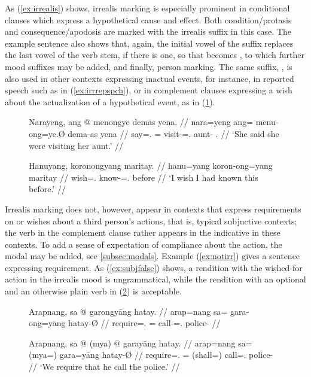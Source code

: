 As (\ref{ex:irrealis}) shows, irrealis marking is especially prominent in
conditional clauses which express a hypothetical cause and effect. Both
condition/protasis and consequence/apodosis are marked with the irrealis suffix
in this case. The example sentence also shows that, again, the initial vowel of
the suffix replaces the last vowel of the verb stem, if there is one, so that
 becomes , to which further mood
suffixes may be added, and finally, person marking. The same suffix,
, is also used in other contexts expressing inactual events,
for instance, in reported speech such as in (\ref{ex:irrrepspch}), or in
complement clauses expressing a wish about the actualization of a hypothetical
event, as in (\ref{ex:irrwish}).

\begin{figure}[h]
\pex
\a\label{ex:irrrepspch}\begingl
	\gla Narayeng, ang @ menongye demās yena. //
	\glb nara=yeng ang= menu-ong=ye.Ø dema-as yena //
	\glc say=\TsgF{}.\Aarg{} \AgtT{}= visit-\Irr{}=\TsgF{}.\Top{} 
		aunt-\Parg{} \TsgF{}.\Gen{} //
	\glft `She said she were visiting her aunt.' //
\endgl

\a\label{ex:irrwish}\begingl
	\gla Hanuyang, koronongyang maritay. //
	\glb hanu=yang koron-ong=yang maritay //
	\glc wish=\Fsg{}.\Aarg{} know-\Irr{}=\Fsg{}.\Aarg{} before //
	\glft `I wish I had known this before.' //
\endgl
\xe
\end{figure}

Irrealis marking does not, however, appear in contexts that express
requirements on or wishes about a third person's actions, that is, typical
subjuctive contexts; the verb in the complement clause rather appears in the
indicative in these contexts. To add a sense of expectation of compliance about
the action, the modal  may be added, see
\autoref{subsec:modals}. Example (\ref{ex:notirr}) gives a sentence expressing
requirement. As (\ref{ex:subjfalse}) shows, a rendition with the wished-for
action in the irrealis mood is ungrammatical, while the rendition with an
optional  and an otherwise plain verb in (\ref{ex:myashall}) is
acceptable.

\begin{figure}[h]
\pex\label{ex:notirr}
\a\label{ex:subjfalse}\ljudge*\begingl
	\gla Arapnang, sa @ garongyāng hatay. //
	\glb arap=nang sa= gara-ong=yāng hatay-Ø //
	\glc require=\Fpl{}.\Aarg{} \PatT{}= call-\Irr{}=\TsgM{}.\Aarg{}
		police-\Top{} //
\endgl

\a\label{ex:myashall}\begingl
	\gla Arapnang, sa @ \textup{(}mya\textup{)} @ garayāng hatay. //
	\glb arap=nang sa= (mya=) gara=yāng hatay-Ø //
	\glc require=\Fpl{}.\Aarg{} \PatT{}= (shall=) call=\TsgM{}.\Aarg{}
		police-\Top{} //
	\glft `We require that he call the police.' //
\endgl
\xe
\end{figure}

